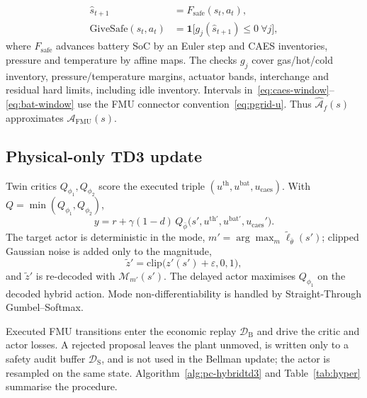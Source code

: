 \documentclass[conference]{IEEEtran}
\newcommand{\Afhat}{\widehat{\mathcal{A}}_{f}}
\newcommand{\AFMU}{\mathcal{A}_{\mathrm{FMU}}}
\begin{document}
\begin{equation}
\begin{aligned}
\hat s_{t+1}&=F_{\mathrm{safe}}(s_t,a_t),\\
\mathrm{GiveSafe}(s_t,a_t)
&=\mathbf{1}\bigl[g_j(\hat s_{t+1})\le 0\ \forall j\bigr],
\end{aligned}
\label{eq:givesafe}
\end{equation}
where \(F_{\mathrm{safe}}\) advances battery SoC by an Euler step and CAES inventories, pressure and temperature by affine maps. The checks \(g_j\) cover gas/hot/cold inventory, pressure/temperature margins, actuator bands, interchange and residual hard limits, including idle inventory. Intervals in~\eqref{eq:caes-window}--\eqref{eq:bat-window} use the FMU connector convention~\eqref{eq:pgrid-u}. Thus \(\Afhat(s)\) approximates \(\AFMU(s)\).

\subsection{Physical-only TD3 update}
\label{sec:td3}

Twin critics \(Q_{\phi_1},Q_{\phi_2}\) score the executed triple \((u^{\mathrm{th}},u^{\mathrm{bat}},u_{\mathrm{caes}})\). With \(Q=\min(Q_{\phi_1},Q_{\phi_2})\),
\begin{equation}
y
=
r+\gamma(1-d)\,Q_{\bar\phi}\bigl(s',u^{\mathrm{th}\prime},u^{\mathrm{bat}\prime},u_{\mathrm{caes}}'\bigr).
\label{eq:td3-y}
\end{equation}
The target actor is deterministic in the mode, \(m'=\arg\max_m\tilde\ell_{\bar\theta}(s')\); clipped Gaussian noise is added only to the magnitude,
\begin{equation}
\tilde z'=\mathrm{clip}\bigl(z'(s')+\varepsilon,0,1\bigr),
\label{eq:target-mag}
\end{equation}
and \(\tilde z'\) is re-decoded with \(\mathcal{M}_{m'}(s')\). The delayed actor maximises \(Q_{\phi_1}\) on the decoded hybrid action. Mode non-differentiability is handled by Straight-Through Gumbel--Softmax.

Executed FMU transitions enter the economic replay \(\mathcal{D}_{\mathrm{B}}\) and drive the critic and actor losses. A rejected proposal leaves the plant unmoved, is written only to a safety audit buffer \(\mathcal{D}_{\mathrm{S}}\), and is not used in the Bellman update; the actor is resampled on the same state. Algorithm~\ref{alg:pc-hybridtd3} and Table~\ref{tab:hyper} summarise the procedure.
\end{document}
